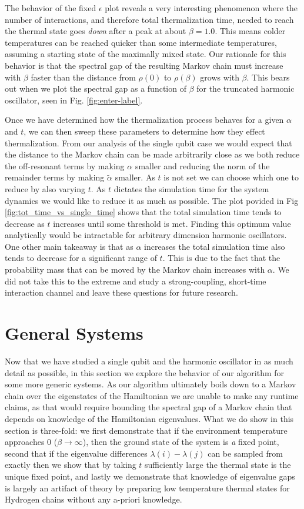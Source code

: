 \documentclass{article}
\begin{document}
The behavior of the fixed $\epsilon$ plot reveals a very interesting phenomenon where the number of interactions, and therefore total thermalization time, needed to reach the thermal state goes \emph{down} after a peak at about $\beta = 1.0$. This means colder temperatures can be reached quicker than some intermediate temperatures, assuming a starting state of the maximally mixed state. Our rationale for this behavior is that the spectral gap of the resulting Markov chain must increase with $\beta$ faster than the distance from $\rho(0)$ to $\rho(\beta)$ grows with $\beta$. This bears out when we plot the spectral gap as a function of $\beta$ for the truncated harmonic oscillator, seen in Fig. \ref{fig:enter-label}.

Once we have determined how the thermalization process behaves for a given $\alpha$ and $t$, we can then sweep these parameters to determine how they effect thermalization. From our analysis of the single qubit case we would expect that the distance to the Markov chain can be made arbitrarily close as we both reduce the off-resonant terms by making $\alpha$ smaller and reducing the norm of the remainder terms by making $\widetilde{\alpha}$ smaller. As $t$ is not set we can choose which one to reduce by also varying $t$. As $t$ dictates the simulation time for the system dynamics we would like to reduce it as much as possible. The plot povided in Fig \ref{fig:tot_time_vs_single_time} shows that the total simulation time tends to decrease as $t$ increases until some threshold is met. Finding this optimum value analytically would be intractable for arbitrary dimension harmonic oscillators. One other main takeaway is that as $\alpha$ increases the total simulation time also tends to decrease for a significant range of $t$. This is due to the fact that the probability mass that can be moved by the Markov chain increases with $\alpha$. We did not take this to the extreme and study a strong-coupling, short-time interaction channel and leave these questions for future research. 


\section{General Systems}
 Now that we have studied a single qubit and the harmonic oscillator in as much detail as possible, in this section we explore the behavior of our algorithm for some more generic systems. As our algorithm ultimately boils down to a Markov chain over the eigenstates of the Hamiltonian we are unable to make any runtime claims, as that would require bounding the spectral gap of a Markov chain that depends on knowledge of the Hamiltonian eigenvalues. What we do show in this section is three-fold: we first demonstrate that if the environment temperature approaches 0 ($\beta \to \infty$), then the ground state of the system is \emph{a} fixed point, second that if the eigenvalue differences $\lambda(i) - \lambda(j)$ can be sampled from exactly then we show that by taking $t$ sufficiently large the thermal state is the unique fixed point, and lastly we demonstrate that knowledge of eigenvalue gaps is largely an artifact of theory by preparing low temperature thermal states for Hydrogen chains without any a-priori knowledge.
 
\end{document}
